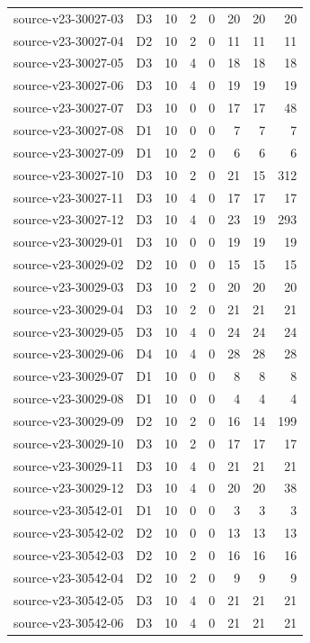 \begin{longtable}{p{}lrrrrrr}
source-v23-30027-03 & D3 & 10 & 2 & 0 & 20 & 20 & 20\\
source-v23-30027-04 & D2 & 10 & 2 & 0 & 11 & 11 & 11\\
source-v23-30027-05 & D3 & 10 & 4 & 0 & 18 & 18 & 18\\
source-v23-30027-06 & D3 & 10 & 4 & 0 & 19 & 19 & 19\\
source-v23-30027-07 & D3 & 10 & 0 & 0 & 17 & 17 & 48\\
source-v23-30027-08 & D1 & 10 & 0 & 0 & 7 & 7 & 7\\
source-v23-30027-09 & D1 & 10 & 2 & 0 & 6 & 6 & 6\\
source-v23-30027-10 & D3 & 10 & 2 & 0 & 21 & 15 & 312\\
source-v23-30027-11 & D3 & 10 & 4 & 0 & 17 & 17 & 17\\
source-v23-30027-12 & D3 & 10 & 4 & 0 & 23 & 19 & 293\\
source-v23-30029-01 & D3 & 10 & 0 & 0 & 19 & 19 & 19\\
source-v23-30029-02 & D2 & 10 & 0 & 0 & 15 & 15 & 15\\
source-v23-30029-03 & D3 & 10 & 2 & 0 & 20 & 20 & 20\\
source-v23-30029-04 & D3 & 10 & 2 & 0 & 21 & 21 & 21\\
source-v23-30029-05 & D3 & 10 & 4 & 0 & 24 & 24 & 24\\
source-v23-30029-06 & D4 & 10 & 4 & 0 & 28 & 28 & 28\\
source-v23-30029-07 & D1 & 10 & 0 & 0 & 8 & 8 & 8\\
source-v23-30029-08 & D1 & 10 & 0 & 0 & 4 & 4 & 4\\
source-v23-30029-09 & D2 & 10 & 2 & 0 & 16 & 14 & 199\\
source-v23-30029-10 & D3 & 10 & 2 & 0 & 17 & 17 & 17\\
source-v23-30029-11 & D3 & 10 & 4 & 0 & 21 & 21 & 21\\
source-v23-30029-12 & D3 & 10 & 4 & 0 & 20 & 20 & 38\\
source-v23-30542-01 & D1 & 10 & 0 & 0 & 3 & 3 & 3\\
source-v23-30542-02 & D2 & 10 & 0 & 0 & 13 & 13 & 13\\
source-v23-30542-03 & D2 & 10 & 2 & 0 & 16 & 16 & 16\\
source-v23-30542-04 & D2 & 10 & 2 & 0 & 9 & 9 & 9\\
source-v23-30542-05 & D3 & 10 & 4 & 0 & 21 & 21 & 21\\
source-v23-30542-06 & D3 & 10 & 4 & 0 & 21 & 21 & 21\\

\end{longtable}
